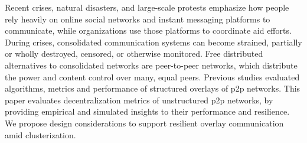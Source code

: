 Recent crises, natural disasters, and large-scale protests emphasize how people rely heavily on online social networks and instant messaging platforms to communicate, while organizations use those platforms to coordinate aid efforts.
During crises, consolidated communication systems can become strained, partially or wholly destroyed, censored, or otherwise monitored.
Free distributed alternatives to consolidated networks are peer-to-peer networks, which distribute the power and content control over many, equal peers.
Previous studies evaluated algorithms, metrics and performance of structured overlays of p2p networks.
This paper evaluates decentralization metrics of unstructured p2p networks, by providing empirical and simulated insights to their performance and resilience.
We propose design considerations to support resilient overlay communication amid clusterization.
